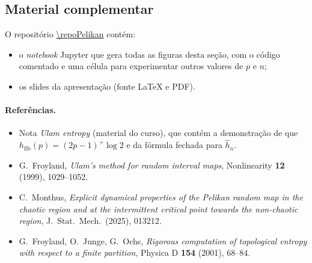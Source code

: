 \subsection{Material complementar}

O repositório \url{\repoPelikan} contém:
\begin{itemize}
  \item o \emph{notebook} Jupyter que gera todas as figuras desta seção, com o código comentado e
        uma célula para experimentar outros valores de $p$ e $n$;
  \item os slides da apresentação (fonte \LaTeX{} e PDF).
\end{itemize}

\paragraph{Referências.}
\begin{itemize}
  \item Nota \emph{Ulam entropy} (material do curso), que contém a demonstração de que
        $h_{\mathrm{fib}}(p)=(2p-1)^+\log2$ e da fórmula fechada para $\hat h_n$.
  \item G.~Froyland, \emph{Ulam's method for random interval maps}, Nonlinearity \textbf{12}
        (1999), 1029--1052.
  \item C.~Monthus, \emph{Explicit dynamical properties of the Pelikan random map in the chaotic
        region and at the intermittent critical point towards the non-chaotic region},
        J.~Stat.~Mech.\ (2025), 013212.
  \item G.~Froyland, O.~Junge, G.~Ochs, \emph{Rigorous computation of topological entropy with
        respect to a finite partition}, Physica D \textbf{154} (2001), 68--84.
\end{itemize}
